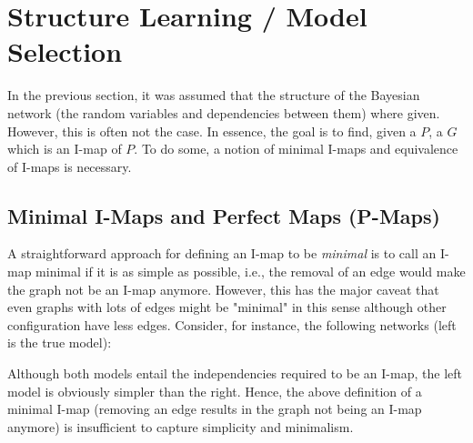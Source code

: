 	\section{Structure Learning / Model Selection}
		In the previous section, it was assumed that the structure of the Bayesian network (the random variables and dependencies between them) where given. However, this is often not the case. In essence, the goal is to find, given a \(P\), a \(G\) which is an I-map of \(P\). To do some, a notion of minimal I-maps and equivalence of I-maps is necessary.

		\subsection{Minimal I-Maps and Perfect Maps (P-Maps)}
			A straightforward approach for defining an I-map to be \emph{minimal} is to call an I-map minimal if it is as simple as possible, i.e., the removal of an edge would make the graph not be an I-map anymore. However, this has the major caveat that even graphs with lots of edges might be "minimal" in this sense although other configuration have less edges. Consider, for instance, the following networks (left is the true model):
			\begin{center}
			\end{center}
			Although both models entail the independencies required to be an I-map, the left model is obviously simpler than the right. Hence, the above definition of a minimal I-map (removing an edge results in the graph not being an I-map anymore) is insufficient to capture simplicity and minimalism.

